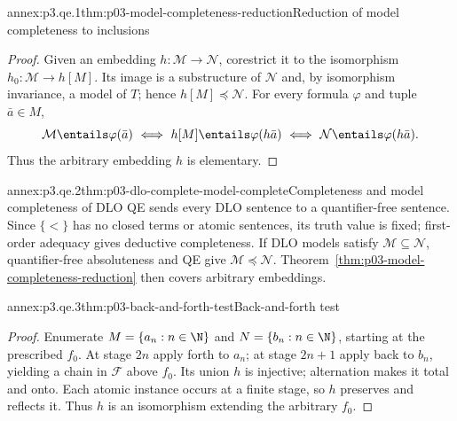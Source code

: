 
\begin{annexitem}{annex:p3.qe.1}{thm:p03-model-completeness-reduction}{Reduction of model completeness to inclusions}
\begin{proof}
Given an embedding \(h:\mathcal M\to\mathcal N\), corestrict it to the isomorphism \(h_0:\mathcal M\to h[M]\).
Its image is a substructure of \(\mathcal N\) and, by isomorphism invariance, a model of \(T\); hence \(h[M]\preccurlyeq\mathcal N\).
For every formula \(\varphi\) and tuple \(\bar a\in M\),
\[
 \mathcal M\entails\varphi(\bar a)\ \Longleftrightarrow\ h[M]\entails\varphi(h\bar a)\ \Longleftrightarrow\ \mathcal N\entails\varphi(h\bar a).
\]
Thus the arbitrary embedding \(h\) is elementary.
\end{proof}
\end{annexitem}

\begin{annexitem}{annex:p3.qe.2}{thm:p03-dlo-complete-model-complete}{Completeness and model completeness of DLO}
QE sends every DLO sentence to a quantifier-free sentence.  Since \(\{<\}\) has no closed terms or atomic sentences, its truth value is fixed; first-order adequacy gives deductive completeness.
If DLO models satisfy \(\mathcal M\subseteq\mathcal N\), quantifier-free absoluteness and QE give \(\mathcal M\preccurlyeq\mathcal N\).
Theorem~\ref{thm:p03-model-completeness-reduction} then covers arbitrary embeddings.
\end{annexitem}

\begin{annexitem}{annex:p3.qe.3}{thm:p03-back-and-forth-test}{Back-and-forth test}
\begin{proof}
Enumerate \(M=\{a_n:n\in\N\}\) and \(N=\{b_n:n\in\N\}\), starting at the prescribed \(f_0\).
At stage \(2n\) apply forth to \(a_n\); at stage \(2n+1\) apply back to \(b_n\), yielding a chain in \(\mathcal F\) above \(f_0\).
Its union \(h\) is injective; alternation makes it total and onto.
Each atomic instance occurs at a finite stage, so \(h\) preserves and reflects it.
Thus \(h\) is an isomorphism extending the arbitrary \(f_0\).
\end{proof}
\end{annexitem}

